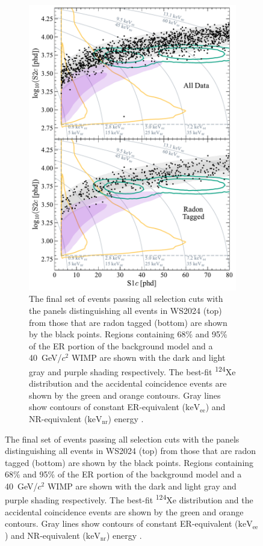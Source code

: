 \begin{figure}[!ht]
	\centering
	\begin{subfigure}[b]{0.49\textwidth}
		\centering
		\includegraphics[width=\textwidth]{figures/WS2024Result/figure3.pdf}
        \caption{The final set of events passing all selection cuts with the panels distinguishing all events in WS2024 (top) from those that are radon tagged (bottom) are shown by the black points. Regions containing 68\% and 95\% of the ER portion of the background model and a 40~GeV/$c^2$ WIMP are shown with the dark and light gray and purple shading respectively. The best-fit \textsuperscript{124}Xe distribution and the accidental coincidence events are shown by the green and orange contours. Gray lines show contours of constant ER-equivalent ($\text{keV}_\text{ee}$) and NR-equivalent ($\text{keV}_\text{nr}$) energy \cite{LZCollaboration:2024lux}.}
		\label{fig:WS2024Result/fig3}
	\end{subfigure}

\end{figure}
